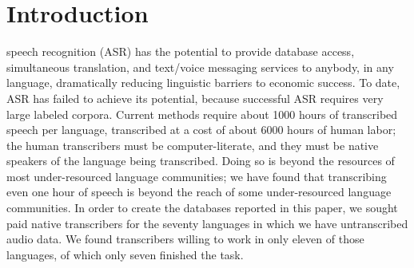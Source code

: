 \section{Introduction}

 speech recognition (ASR) has the potential to provide
database access, simultaneous translation, and text/voice messaging
services to anybody, in any language, dramatically reducing linguistic
barriers to economic success.  To date, ASR has failed to achieve its
potential, because successful ASR requires very large labeled
corpora. Current methods require about 1000 hours of transcribed
speech per language, transcribed at a cost of about 6000 hours of
human labor; the human transcribers must be computer-literate, and
they must be native speakers of the language being transcribed.
{\color{blue} Doing so is beyond the resources of most under-resourced language
communities; we have found that transcribing even one hour of speech
is beyond the reach of some under-resourced language communities.
In order to create the databases reported in this paper, we sought
paid native transcribers for the seventy languages in which we have
untranscribed audio data.  We found transcribers willing to work in
only eleven of those languages, of which only seven finished the task.}

